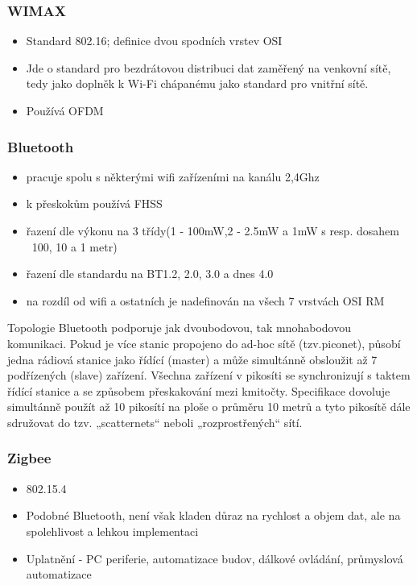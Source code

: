 \documentclass[10pt,a4paper]{article}
\begin{document}
\subsubsection{WIMAX}
\begin{itemize}
\item Standard 802.16; definice dvou spodních vrstev OSI
\item Jde o standard pro bezdrátovou distribuci dat zaměřený na venkovní sítě, tedy jako doplněk k Wi-Fi chápanému jako standard pro vnitřní sítě.
\item Používá OFDM
\end{itemize}

\subsubsection{Bluetooth}
\begin{itemize}
\item pracuje spolu s některými wifi zařízeními na kanálu 2,4Ghz
\item k přeskokům používá FHSS
\item řazení dle výkonu na 3 třídy(1 - 100mW,2 - 2.5mW a 1mW s resp. dosahem ~100, 10 a 1 metr)
\item řazení dle standardu na BT1.2, 2.0, 3.0 a dnes 4.0
\item na rozdíl od wifi a ostatních je nadefinován na všech 7 vrstvách OSI RM
\end{itemize}

Topologie
Bluetooth podporuje jak dvoubodovou, tak mnohabodovou komunikaci. Pokud je více stanic propojeno do ad-hoc sítě (tzv.piconet), působí jedna rádiová stanice jako řídící (master) a může simultánně obsloužit až 7 podřízených (slave) zařízení. Všechna zařízení v pikosíti se synchronizují s taktem řídící stanice a se způsobem přeskakování mezi kmitočty. Specifikace dovoluje simultánně použít až 10 pikosítí na ploše o průměru 10 metrů a tyto pikosítě dále sdružovat do tzv. „scatternets“ neboli „rozprostřených“ sítí.
\subsubsection{Zigbee}
\begin{itemize}
\item 802.15.4
\item Podobné Bluetooth, není však kladen důraz na rychlost a objem dat, ale na spolehlivost a lehkou implementaci
\item Uplatnění - PC periferie, automatizace budov, dálkové ovládání, průmyslová automatizace
\end{itemize}
\end{document}
